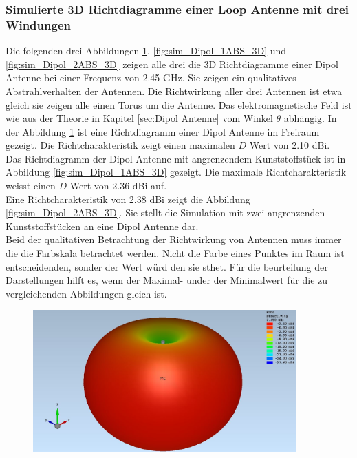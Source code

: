 \subsubsection{Simulierte 3D Richtdiagramme einer Loop Antenne mit drei Windungen}
Die folgenden drei Abbildungen \ref{fig:sim_Dipol_Freiraum_3D},
\ref{fig:sim_Dipol_1ABS_3D} und 
\ref{fig:sim_Dipol_2ABS_3D} zeigen alle drei die 3D Richtdiagramme einer Dipol Antenne bei einer Frequenz von 2.45 GHz. Sie zeigen ein qualitatives Abstrahlverhalten der Antennen. Die Richtwirkung aller drei Antennen ist etwa gleich sie zeigen alle einen Torus um die Antenne. Das elektromagnetische Feld ist wie aus der Theorie in Kapitel \ref{sec:Dipol Antenne} vom Winkel $\theta$ abhängig.
In der Abbildung \ref{fig:sim_Dipol_Freiraum_3D} ist eine Richtdiagramm einer Dipol Antenne im Freiraum gezeigt. Die Richtcharakteristik zeigt einen maximalen $D$ Wert  von 2.10 dBi.\\
Das Richtdiagramm der Dipol Antenne mit angrenzendem Kunststoffstück ist in Abbildung \ref{fig:sim_Dipol_1ABS_3D} gezeigt. Die maximale Richtcharakteristik weisst einen $D$ Wert von 2.36 dBi auf.\\
Eine Richtcharakteristik von 2.38 dBi zeigt die Abbildung \ref{fig:sim_Dipol_2ABS_3D}. Sie stellt die Simulation mit zwei angrenzenden Kunststoffstücken an eine Dipol Antenne dar.\\
Beid der qualitativen Betrachtung der Richtwirkung von Antennen muss immer die die Farbskala betrachtet werden. Nicht die Farbe eines Punktes im Raum ist entscheidenden, sonder der Wert würd den sie sthet. Für die beurteilung der Darstellungen hilft es, wenn der Maximal- under der Minimalwert für die zu vergleichenden Abbildungen gleich ist.
\begin{figure}[h]
	\begin{center}
		\includegraphics[width=0.9\textwidth]{content/bilder/Evaluation/Dipol/3D_Dipol_Freiraum.JPG}
		\label{fig:sim_Dipol_Freiraum_3D}
	\end{center}
\end{figure}
